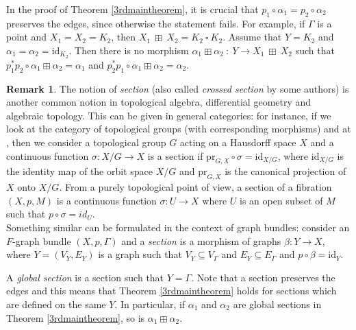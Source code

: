 \documentclass{amsart}
\theoremstyle{definition}
\newtheorem{rem}[theo]{Remark}
\numberwithin{equation}{section}
\begin{document}
In the proof of Theorem \ref{3rdmaintheorem}, it is crucial that $p_1 \circ \alpha_1 = p_2 \circ \alpha_2$ preserves the edges, since otherwise the statement fails. For example, if $\Gamma$ is a point and  $X_1 = X_2 = K_2$, then $X_1  \ \boxplus  \ X_2 = K_2  \ \square  \ K_2$. Assume that $Y = K_2$ and  $\alpha_1 = \alpha_2 = \mathrm{id}_{K_2}$. Then there is no morphism $\alpha_1   \boxplus   \alpha_2 \ :  \ Y \longrightarrow X_1 \  \boxplus \ X_2$ such that $p_1^*p_2 \circ \alpha_1   \boxplus   \alpha_2 = \alpha_1$ and   $p_2^*p_1 \circ \alpha_1   \boxplus   \alpha_2 = \alpha_2.$

\begin{rem}\label{crosssectionnormal} The notion of  \textit{ section} (also called \textit{crossed section} by some authors) is another common notion in topological algebra, differential geometry and algebraic topology. This can be given in general categories: for instance, if we look at the category of topological groups (with corresponding morphisms) and at \cite[Definition 10.9]{hofmor}, then we  consider a topological group $G$ acting on a Hausdorff space $X$ and  a continuous function $\sigma : X/G \to X$ is a section if  $\mathrm{pr}_{G,X} \circ \sigma =\mathrm{id}_{X/G}$, where $\mathrm{id}_{X/G}$ is the identity map of the orbit space $X/G$ and  $\mathrm{pr}_{G,X}$ is the canonical projection of $X$ onto $X/G$. 
From a purely topological point of view, a section of a fibration $(X, p, M)$ is a continuous function $\sigma: U \longrightarrow X$ where $U$ is an open subset of $M$ such that $p \circ \sigma = id_U$.
\\Something similar can be formulated in the context of graph bundles: consider an $F$-graph bundle $(X, p, \Gamma)$ and a \textit{ section}  is a morphism of graphs $\beta: Y \longrightarrow X$, where $Y=(V_Y, E_Y)$ is a graph such that $V_Y \subseteq V_\Gamma$ and $E_Y \subseteq E_\Gamma$ and $p \circ \beta = \mathrm{id}_Y$.


A \textit{global section} is a section such that $Y = \Gamma$. Note that a section  preserves the edges and this means that Theorem \ref{3rdmaintheorem} holds for sections which are defined on the same $Y$. In particular, if $\alpha_1$ and $\alpha_2$ are global sections in Theorem \ref{3rdmaintheorem}, so is $\alpha_1 \boxplus \alpha_2$.
\end{rem}
\end{document}
